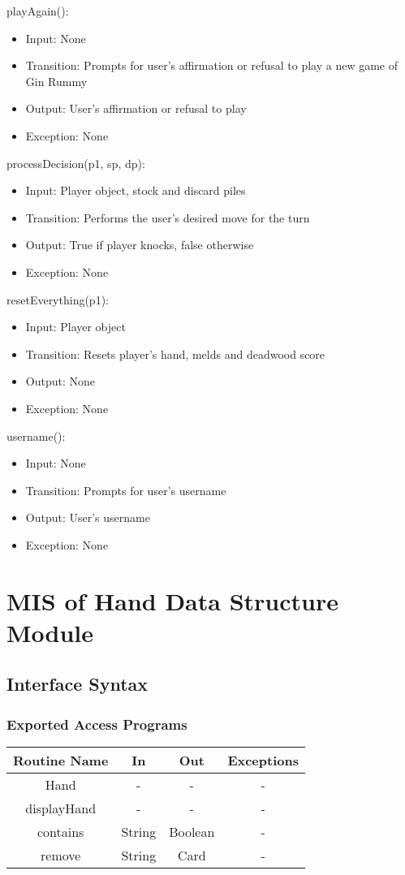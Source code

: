 \documentclass[12pt, titlepage]{article}
\begin{document}
\noindent playAgain():
\begin{itemize}
    \item Input: None
    \item Transition: Prompts for user's affirmation or refusal to play a new game of Gin Rummy
    \item Output: User's affirmation or refusal to play
    \item Exception: None
\end{itemize}

\noindent processDecision(p1, sp, dp):
\begin{itemize}
    \item Input: Player object, stock and discard piles
    \item Transition: Performs the user's desired move for the turn
    \item Output: True if player knocks, false otherwise
    \item Exception: None
\end{itemize}

\noindent resetEverything(p1):
\begin{itemize}
    \item Input: Player object
    \item Transition: Resets player's hand, melds and deadwood score
    \item Output: None
    \item Exception: None
\end{itemize}

\noindent username():
\begin{itemize}
    \item Input: None
    \item Transition: Prompts for user's username
    \item Output: User's username
    \item Exception: None
\end{itemize}

\section{MIS of Hand Data Structure Module}

\subsection{Interface Syntax}
\subsubsection{Exported Access Programs}
\begin{tabular}[pos]{| c | c | c | c |}
    \hline
    \textbf{Routine Name} & \textbf{In} & \textbf{Out} & \textbf{Exceptions}\\
    \hline
    Hand & - & - & -\\
    \hline
    displayHand & - & - & -\\
    \hline
    contains & String & Boolean & -\\
    \hline
    remove & String & Card & - \\
    \hline
\end{tabular}
\end{document}
